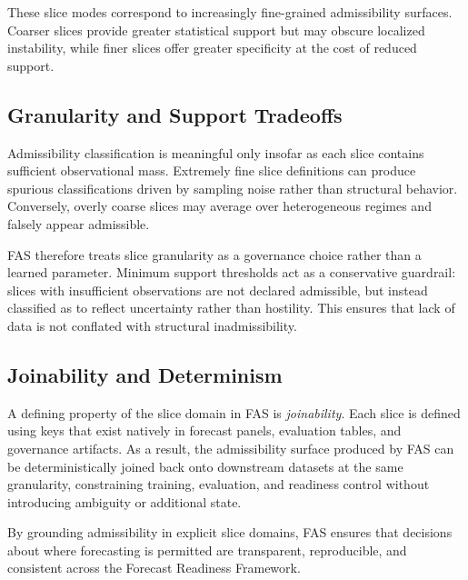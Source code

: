 These slice modes correspond to increasingly fine-grained admissibility surfaces.
Coarser slices provide greater statistical support but may obscure localized
instability, while finer slices offer greater specificity at the cost of reduced
support.

\subsection{Granularity and Support Tradeoffs}

Admissibility classification is meaningful only insofar as each slice contains
sufficient observational mass. Extremely fine slice definitions can produce
spurious classifications driven by sampling noise rather than structural
behavior. Conversely, overly coarse slices may average over heterogeneous regimes
and falsely appear admissible.

FAS therefore treats slice granularity as a governance choice rather than a
learned parameter. Minimum support thresholds act as a conservative guardrail:
slices with insufficient observations are not declared admissible, but instead
classified as \Conditional to reflect uncertainty rather than hostility. This
ensures that lack of data is not conflated with structural inadmissibility.

\subsection{Joinability and Determinism}

A defining property of the slice domain in FAS is \emph{joinability}. Each slice
is defined using keys that exist natively in forecast panels, evaluation tables,
and governance artifacts. As a result, the admissibility surface produced by FAS
can be deterministically joined back onto downstream datasets at the same
granularity, constraining training, evaluation, and readiness control without
introducing ambiguity or additional state.

By grounding admissibility in explicit slice domains, FAS ensures that decisions
about where forecasting is permitted are transparent, reproducible, and
consistent across the Forecast Readiness Framework.
